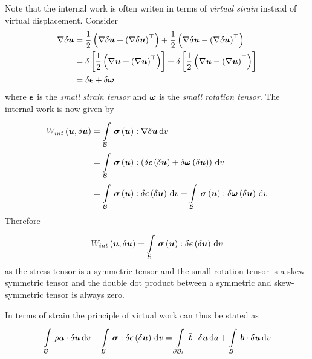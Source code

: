 Note that the internal work is often writen in terms of \emph{virtual strain}
instead of virtual displacement. Consider
\begin{equation}
  \begin{split}
    \gradient{}{\delta\vectr{u}} &= 
    \dfrac{1}{2}\pbrac{\gradient{}{\delta\vectr{u}}+\transpose{\pbrac{\gradient{}{\delta\vectr{u}}}}}+
    \dfrac{1}{2}\pbrac{\gradient{}{\delta\vectr{u}}-\transpose{\pbrac{\gradient{}{\delta\vectr{u}}}}}\\
    &=\delta\sqbrac{\dfrac{1}{2}\pbrac{\gradient{}{\vectr{u}}+\transpose{\pbrac{\gradient{}{\vectr{u}}}}}}+
    \delta\sqbrac{\dfrac{1}{2}\pbrac{\gradient{}{\vectr{u}}-\transpose{\pbrac{\gradient{}{\vectr{u}}}}}} \\
    &=\delta\tensor{\epsilon} +\delta\tensor{\omega}
  \end{split}
\end{equation}
where $\boldsymbol{\mathit{\epsilon}}$ is the \emph{small strain tensor} and
$\boldsymbol{\mathit{\omega}}$ is the \emph{small rotation tensor}. The internal work is now
given by
\begin{equation}
  \begin{split}
    \fnof{W_{int}}{\vectr{u},\delta\vectr{u}}&=
    \gint{\embedmanifold{B}}{}{\doubledotprod{\fnof{\tensor{\sigma}}{\vectr{u}}}{\gradient{}{\delta\vectr{u}}}}{v}\\
    &=\gint{\embedmanifold{B}}{}{\doubledotprod{\fnof{\tensor{\sigma}}{\vectr{u}}}{
        \pbrac{\fnof{\delta\tensor{\epsilon}}{\delta\vectr{u}}+\fnof{\delta\tensor{\omega}}{\delta\vectr{u}}}}}{v} \\
    &=\gint{\embedmanifold{B}}{}{\doubledotprod{\fnof{\tensor{\sigma}}{\vectr{u}}}{\fnof{\delta\tensor{\epsilon}}{\delta\vectr{u}}}}{v}+
    \gint{\embedmanifold{B}}{}{\doubledotprod{\fnof{\tensor{\sigma}}{\vectr{u}}}{\fnof{\delta\tensor{\omega}}{\delta\vectr{u}}}}{v}
  \end{split}
\end{equation}
Therefore
\begin{equation}
  \fnof{W_{int}}{\vectr{u},\delta\vectr{u}}=
  \gint{\embedmanifold{B}}{}{\doubledotprod{\fnof{\tensor{\sigma}}{\vectr{u}}}{\fnof{\delta\tensor{\epsilon}}{\delta\vectr{u}}}}{v}
\end{equation}
as the stress tensor is a symmetric tensor and the small rotation tensor is a
skew-symmetric tensor and the double dot product between a symmetric and
skew-symmetric tensor is always zero.

In terms of strain the principle of virtual work can thus be stated as
\begin{equation}
  \gint{\embedmanifold{B}}{}{\dotprod{\rho\vectr{a}}{\delta\vectr{u}}}{v}+
  \gint{\embedmanifold{B}}{}{\doubledotprod{\tensor{\sigma}}{\fnof{\delta\tensor{\epsilon}}{\delta\vectr{u}}}}{v}=
  \gint{\boundary{\embedmanifold{B}}_{t}}{}{\dotprod{\bar{\vectr{t}}}{\delta\vectr{u}}}{a}+
  \gint{\embedmanifold{B}}{}{\dotprod{\vectr{b}}{\delta\vectr{u}}}{v}
  \label{eqn:virtualworkstrainstatment}
\end{equation}

